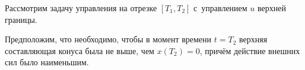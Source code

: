 

























Рассмотрим задачу управления на  отрезке $[T_1, T_2]$ с~управлением $u$ верхней границы.


Предположим, что необходимо, чтобы в момент времени  $t=T_2$ верхняя составляющая конуса была не выше, чем $x(T_2)=0$, причём действие внешних сил было наименьшим.



